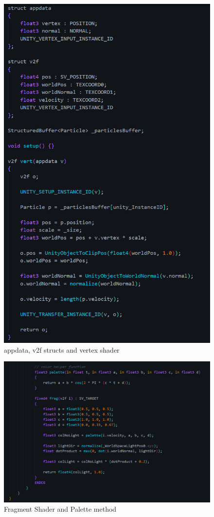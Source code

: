 \documentclass[12pt]{article}
\begin{document}
    \begin{figure}[H]
        \centering
        \includegraphics[height=0.9\textheight]{newShader2.png}
        \caption{appdata, v2f structs and vertex shader}
    \end{figure}

    \begin{figure}[H]
        \centering
        \includegraphics[width=\textwidth]{newShader3.png}
        \caption{Fragment Shader and Palette method}
    \end{figure}
\end{document}
